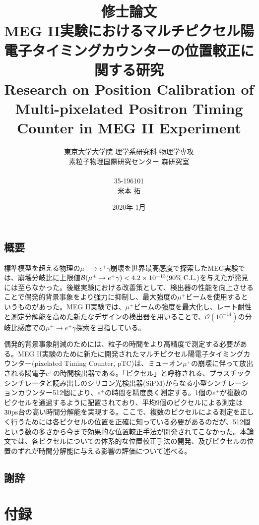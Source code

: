 \documentclass[report]{jsbook}
\title{
修士論文\\[1.8cm]
{\bf MEG II実験におけるマルチピクセル陽電子タイミングカウンターの位置較正に関する研究} \\
{\LARGE Research on Position Calibration of Multi-pixelated Positron Timing Counter in MEG II Experiment}
\\[0.8cm]}
\author{東京大学大学院 理学系研究科 物理学専攻\\
素粒子物理国際研究センター 森研究室\\ \\
35-196101\\[2.5mm]
\LARGE 米本 拓}
\date{2020年 1月}
\begin{document}

\maketitle
\chapter*{概要}

標準模型を超える物理の$\mu^+ \to e^+\gamma$崩壊を世界最高感度で探索したMEG実験では、崩壊分岐比に上限値$\mathcal{B} (\mu^+ \to e^+\gamma) < 4.2 \times 10^{-13} (90\% \; {\rm C.L.})$を与えたが発見には至らなかった。後継実験における改善策として、検出器の性能を向上させることで偶発的背景事象をより強力に抑制し、最大強度の$\mu^+$ビームを使用するというものがあった。MEG II実験では、$\mu^+$ビームの強度を最大化し、レート耐性と測定分解能を高めた新たなデザインの検出器を用いることで、$\mathcal{O}(10^{-14})$の分岐比感度での$\mu^+ \to e^+\gamma$探索を目指している。 

偶発的背景事象削減のためには、粒子の時間をより高精度で測定する必要がある。MEG II実験のために新たに開発されたマルチピクセル陽電子タイミングカウンター(pixelated Timing Counter, pTC)は、ミューオン$\mu^+$の崩壊に伴って放出される陽電子$e^+$の時間検出器である。「ピクセル」と呼称される、プラスチックシンチレータと読み出しのシリコン光検出器(SiPM)からなる小型シンチレーションカウンター512個により、$e^+$の時間を精度良く測定する。1個の$e^+$が複数のピクセルを通過するように配置されており、平均9個のピクセルによる測定は$ 30 \rm ps$台の高い時間分解能を実現する。ここで、複数のピクセルによる測定を正しく行うためには各ピクセルの位置を正確に知っている必要があるのだが、512個という数の多さから今まで効果的な位置較正手法が開発されてこなかった。本論文では、各ピクセルについての体系的な位置較正手法の開発、及びピクセルの位置のずれが時間分解能に与える影響の評価について述べる。 \\

\setcounter{tocdepth}{2}
\tableofcontents








\chapter*{謝辞}

\part{付録}
\appendix
\end{document}
